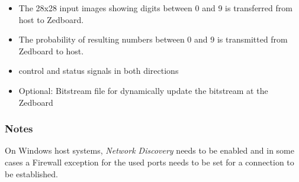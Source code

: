\begin{itemize}
	\item The 28x28 input images showing digits between 0 and 9 is transferred from host to Zedboard.
	\item The probability of resulting numbers between 0 and 9 is transmitted from Zedboard to host.
	\item control and status signals in both directions 
	\item Optional: Bitstream file for dynamically update the bitstream at the Zedboard
\end{itemize}

\subsubsection{Notes}
On Windows host systems, \emph{Network Discovery} needs to be enabled and in some cases a Firewall exception for the used ports needs to be set for a connection to be established. \\